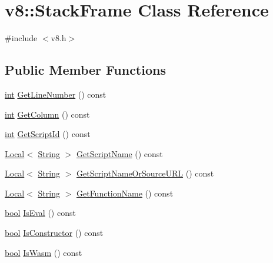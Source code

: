 \hypertarget{classv8_1_1StackFrame}{}\section{v8\+:\+:Stack\+Frame Class Reference}
\label{classv8_1_1StackFrame}


{\ttfamily \#include $<$v8.\+h$>$}

\subsection*{Public Member Functions}
\begin{DoxyCompactItemize}
\item 
\mbox{\hyperlink{classint}{int}} \mbox{\hyperlink{classv8_1_1StackFrame_a34ab9f48a06525cd9f93e01a70427ca2}{Get\+Line\+Number}} () const
\item 
\mbox{\hyperlink{classint}{int}} \mbox{\hyperlink{classv8_1_1StackFrame_a3b4d7d29ae82b88304d09ea5c5e43db1}{Get\+Column}} () const
\item 
\mbox{\hyperlink{classint}{int}} \mbox{\hyperlink{classv8_1_1StackFrame_ac2f0f26b9c7aee860cdd613c0d83ae35}{Get\+Script\+Id}} () const
\item 
\mbox{\hyperlink{classv8_1_1Local}{Local}}$<$ \mbox{\hyperlink{classv8_1_1String}{String}} $>$ \mbox{\hyperlink{classv8_1_1StackFrame_a50ef64008d600ab075e048debbca9214}{Get\+Script\+Name}} () const
\item 
\mbox{\hyperlink{classv8_1_1Local}{Local}}$<$ \mbox{\hyperlink{classv8_1_1String}{String}} $>$ \mbox{\hyperlink{classv8_1_1StackFrame_a57754ab8d2eb6d899289d5dfe1c9d4a3}{Get\+Script\+Name\+Or\+Source\+U\+RL}} () const
\item 
\mbox{\hyperlink{classv8_1_1Local}{Local}}$<$ \mbox{\hyperlink{classv8_1_1String}{String}} $>$ \mbox{\hyperlink{classv8_1_1StackFrame_ab382d964b5c4b55c5886c7d86398556f}{Get\+Function\+Name}} () const
\item 
\mbox{\hyperlink{classbool}{bool}} \mbox{\hyperlink{classv8_1_1StackFrame_aa07e67a6a00adcd0f5c8c4ba7a82e54a}{Is\+Eval}} () const
\item 
\mbox{\hyperlink{classbool}{bool}} \mbox{\hyperlink{classv8_1_1StackFrame_a8f37df38214b6dc10655fc50f0341eb8}{Is\+Constructor}} () const
\item 
\mbox{\hyperlink{classbool}{bool}} \mbox{\hyperlink{classv8_1_1StackFrame_aec6d28360828b8cadc3da6a5dbd83d89}{Is\+Wasm}} () const
\end{DoxyCompactItemize}


